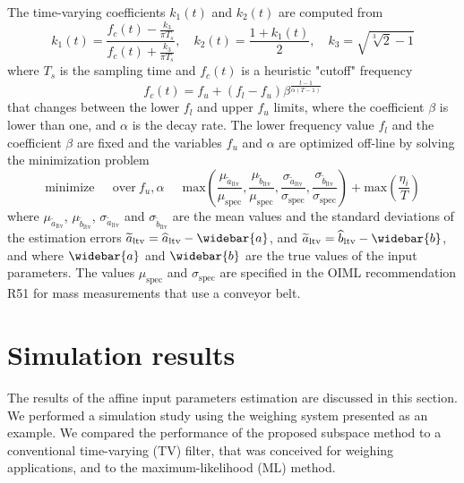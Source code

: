 The time-varying coefficients $k_1(t)$ and $k_2(t)$ are computed from \citep{Pietrzak14}
\begin{equation} k_1(t) = \frac{f_c(t) - \frac{k_3}{\pi T_s}}{f_c(t) + \frac{k_3}{\pi T_s}}, \quad k_2(t) = \frac{1 + k_1(t)}{2} , \quad k_3 = \sqrt{ \sqrt[3]{2}  - 1} \end{equation}
where $T_s$ is the sampling time and $f_c(t)$ is a heuristic "cutoff" frequency
\begin{equation} f_c(t) = f_u + \left( f_l - f_u \right) \beta^{\frac{t-1}{\alpha \left( T-1 \right)} } \end{equation}
that changes between the lower $f_l$ and upper $f_u$ limits, where the coefficient $\beta$ is lower than one, and $\alpha$ is the decay rate. 
The lower frequency value $f_l$ and the coefficient $\beta$ are fixed and the variables $f_u$ and $\alpha$ are optimized off-line by solving the minimization problem 
\begin{equation} \mathrm{minimize} \ \quad \ \mathrm{over} \ f_u, \alpha \ \quad \ \mathrm{max} \left( \dfrac{\mu_{\widetilde{a}_{\mathrm{ltv}}}}{\mu_{\mathrm{spec}}}, \dfrac{\mu_{\widetilde{b}_{\mathrm{ltv}}}}{\mu_{\mathrm{spec}}}, \dfrac{\sigma_{\widetilde{a}_{\mathrm{ltv}}}}{\sigma_{\mathrm{spec}}}, \dfrac{\sigma_{\widetilde{b}_{\mathrm{ltv}}}}{\sigma_{\mathrm{spec}}} \right) + \mathrm{max} \left( \dfrac{\eta_{i}}{T} \right) \label{eqn:tv_optim} \end{equation}
where $\mu_{\widetilde{a}_\mathrm{ltv}}$, $\mu_{\widetilde{b}_\mathrm{ltv}}$, $\sigma_{\widetilde{a}_\mathrm{ltv}}$ and $\sigma_{\widetilde{b}_\mathrm{ltv}}$ are the mean values and the standard deviations of the estimation errors $\widetilde{a}_\mathrm{ltv} = \widehat{a}_\mathrm{ltv} - \widebar{a}$, and $\widetilde{a}_\mathrm{ltv} = \widehat{b}_\mathrm{ltv} - \widebar{b}$, and where $\widebar{a}$ and $\widebar{b}$ are the true values of the input parameters.
The values $\mu_{\mathrm{spec}}$ and $\sigma_{\mathrm{spec}}$ are specified in the OIML recommendation R51 \citep{OIML_R51_1} for mass measurements that use a conveyor belt.


\section{Simulation results}
The results of the affine input parameters estimation are discussed in this section.
We performed a simulation study using the weighing system presented as an example.
We compared the performance of the proposed subspace method to a conventional time-varying (TV) filter, that was conceived for weighing applications, and to the maximum-likelihood (ML) method.

